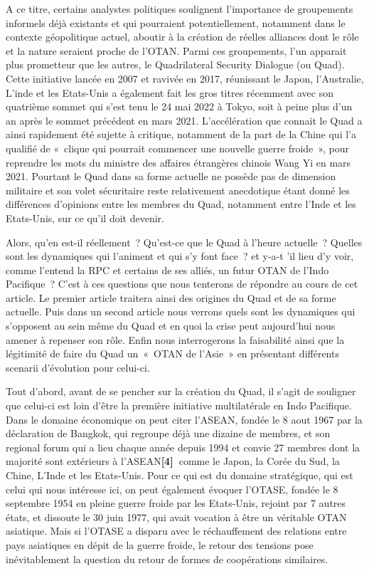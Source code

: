 \documentclass[11pt,a4paper]{article}
\begin{document}
A ce titre, certains analystes politiques soulignent l'importance de groupements informels déjà existants et qui pourraient potentiellement, notamment dans le contexte géopolitique actuel, aboutir à la création de réelles alliances dont le rôle et la nature seraient proche de l'OTAN. Parmi ces groupements, l'un apparait plus prometteur que les autres, le Quadrilateral Security Dialogue (ou Quad). Cette initiative lancée en 2007 et ravivée en 2017, réunissant le Japon, l'Australie, L'inde et les Etats-Unis a également fait les gros titres récemment avec son quatrième sommet qui s'est tenu le 24 mai 2022 à Tokyo, soit à peine plus d'un an après le sommet précédent en mars 2021. L'accélération que connait le Quad a ainsi rapidement été sujette à critique, notamment de la part de la Chine qui l'a qualifié de «~clique qui pourrait commencer une nouvelle guerre froide~», pour reprendre les mots du ministre des affaires étrangères chinois Wang Yi en mars 2021. Pourtant le Quad dans sa forme actuelle ne possède pas de dimension militaire et son volet sécuritaire reste relativement anecdotique étant donné les différences d'opinions entre les membres du Quad, notamment entre l'Inde et les Etats-Unis, sur ce qu'il doit devenir.

Alors, qu'en est-il réellement~? Qu'est-ce que le Quad à l'heure actuelle~? Quelles sont les dynamiques qui l'animent et qui s'y font face~? et y-a-t 'il lieu d'y voir, comme l'entend la RPC et certains de ses alliés, un futur OTAN de l'Indo Pacifique~? C'est à ces questions que nous tenterons de répondre au cours de cet article. Le premier article traitera ainsi des origines du Quad et de sa forme actuelle. Puis dans un second article nous verrons quels sont les dynamiques qui s'opposent au sein même du Quad et en quoi la crise peut aujourd'hui nous amener à repenser son rôle. Enfin nous interrogerons la faisabilité ainsi que la légitimité de faire du Quad un~«~OTAN de l'Asie~» en présentant différents scenarii d'évolution pour celui-ci.

Tout d'abord, avant de se pencher sur la création du Quad, il s'agit de souligner que celui-ci est loin d'être la première initiative multilatérale en Indo Pacifique. Dans le domaine économique on peut citer l'ASEAN, fondée le 8 aout 1967 par la déclaration de Bangkok, qui regroupe déjà une dizaine de membres, et son regional forum qui a lieu chaque année depuis 1994 et convie 27 membres dont la majorité sont extérieurs à l'ASEAN\textbf{{[}4{]}~}comme le Japon, la Corée du Sud, la Chine, L'Inde et les Etats-Unis. Pour ce qui est du domaine stratégique, qui est celui qui nous intéresse ici, on peut également évoquer l'OTASE, fondée le 8 septembre 1954 en pleine guerre froide par les Etats-Unis, rejoint par 7 autres états, et dissoute le 30 juin 1977, qui avait vocation à être un véritable OTAN asiatique. Mais si l'OTASE a disparu avec le réchauffement des relations entre pays asiatiques en dépit de la guerre froide, le retour des tensions pose inévitablement la question du retour de formes de coopérations similaires.
\end{document}
